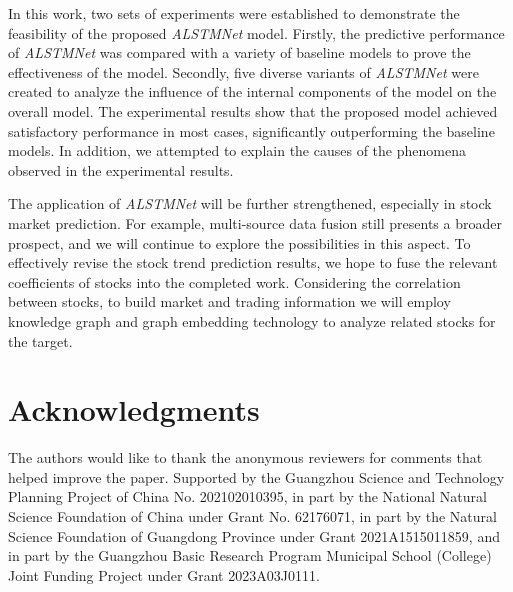 \documentclass[sn-mathphys]{sn-jnl}%
\theoremstyle{thmstyleone}%
\theoremstyle{thmstyletwo}%
\theoremstyle{thmstylethree}%
\begin{document}
In this work, two sets of experiments were established to demonstrate the feasibility of the proposed {\it ALSTMNet} model. Firstly, the predictive performance of {\it ALSTMNet} was compared with a variety of baseline models to prove the effectiveness of the model. Secondly, five diverse variants of {\it ALSTMNet} were created to analyze the influence of the internal components of the model on the overall model. The experimental results show that the proposed model achieved satisfactory performance in most cases, significantly outperforming the baseline models. In addition, we attempted to explain the causes of the phenomena observed in the experimental results.

The application of {\it ALSTMNet} will be further strengthened, especially in stock market prediction. For example, multi-source data fusion still presents a broader prospect, and we will continue to explore the possibilities in this aspect. To effectively revise the stock trend prediction results, we hope to fuse the relevant coefficients of stocks into the completed work. Considering the correlation between stocks, to build market and trading information we will employ knowledge graph and graph embedding technology to analyze related stocks for the target.

\section{Acknowledgments}
The authors would like to thank the anonymous reviewers for comments that helped improve the paper. Supported by the Guangzhou Science and Technology Planning Project of China No. 202102010395, in part by the National Natural Science Foundation of China under Grant No. 62176071, in part by the Natural Science Foundation of Guangdong Province under Grant 2021A1515011859, and in part by the Guangzhou Basic Research Program Municipal School (College) Joint Funding Project under Grant 2023A03J0111.




\end{document}
